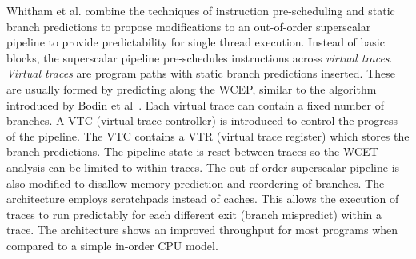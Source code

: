 

Whitham et al. \cite{whitham:08:predOOOwithVirtualTraces} combine the techniques of instruction pre-scheduling and static branch predictions to propose modifications to an out-of-order superscalar pipeline to provide predictability for single thread execution.  
Instead of basic blocks, the superscalar pipeline pre-schedules instructions across \emph{virtual traces}\cite{Whitham2008formvirtualtraces}. 
\emph{Virtual traces} are program paths with static branch predictions inserted. 
These are usually formed by predicting along the WCEP, similar to the algorithm introduced by Bodin et al~\cite{Bodin2005staticbranch}. 
Each virtual trace can contain a fixed number of branches. 
A VTC (virtual trace controller) is introduced to control the progress of the pipeline.
The VTC contains a VTR (virtual trace register) which stores the branch predictions.
The pipeline state is reset between traces so the WCET analysis can be limited to within traces.
The out-of-order superscalar pipeline is also modified to disallow memory prediction and reordering of branches.
The architecture employs scratchpads instead of caches.  
This allows the execution of traces to run predictably for each different exit (branch mispredict) within a trace.
The architecture shows an improved throughput for most programs when compared to a simple in-order CPU model.

